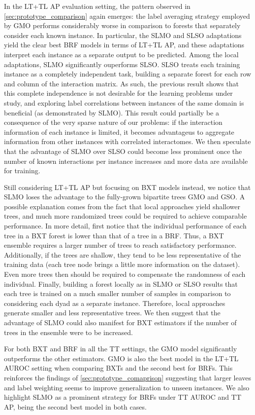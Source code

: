 In the LT+TL AP evaluation setting, the pattern observed in \autoref{sec:prototype_comparison} again emerges: the label averaging strategy employed by GMO performs considerably worse in comparison to forests that separately consider each known instance. In particular, the SLMO and SLSO adaptations yield the clear best BRF models in terms of LT+TL AP, and these adaptations interpret each instance as a separate output to be predicted. Among the local adaptations, SLMO significantly ouperforms SLSO. SLSO treats each training instance as a completely independent task, building a separate forest for each row and column of the interaction matrix. As such, the previous result shows that this complete independence is not desirable for the learning problems under study, and exploring label correlations between instances of the same domain is beneficial (as demonstrated by SLMO). This result could partially be a consequence of the very sparse nature of our problems: if the interaction information of each instance is limited, it becomes advantageus to aggregate information from other instances with correlated interactomes. We then speculate that the advantage of SLMO over SLSO could become less prominent once the number of known interactions per instance increases and more data are available for training.

Still considering LT+TL AP but focusing on BXT models instead, we notice that SLMO loses the advantage to the fully-grown bipartite trees GMO and GSO. A possible explanation comes from the fact that local approaches yield shallower trees, and much more randomized trees could be required to achieve comparable performance. In more detail, first notice that the individual performance of each tree in a BXT forest is lower than that of a tree in a BRF. Thus, a BXT ensemble requires a larger number of trees to reach satisfactory performance. Additionally, if the trees are shallow, they tend to be less representative of the training data (each tree node brings a little more information on the dataset).
Even more trees then should be required to compensate the randomness of each individual. Finally, building a forest locally as in SLMO or SLSO results that each tree is trained on a much smaller number of samples in comparison to considering each dyad as a separate instance. Therefore, local approaches generate smaller and less representative trees. We then suggest that the advantage of SLMO could also manifest for BXT estimators if the number of trees in the ensemble were to be increased.

For both BXT and BRF in all the TT settings, the GMO model significantly outperforms the other estimators. GMO is also the best model in the LT+TL AUROC setting when comparing BXTs and the second best for BRFs. This reinforces the findings of \autoref{sec:prototype_comaprison} suggesting that larger leaves and label weighting seems to improve generalization to unseen instances.
%
We also highlight SLMO as a prominent strategy for BRFs under TT AUROC and TT AP, being the second best model in both cases.

